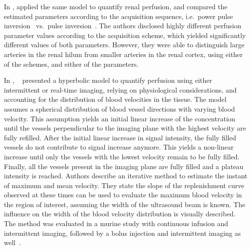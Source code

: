 In \citeyear{Schlosser:2001vv}, \citet{Schlosser:2001vv} applied the same model to quantify renal perfusion, %
and compared the estimated parameters according to the acquisition sequence, i.e.~power pulse inversion~\cite{Simpson:1997jn} vs.~pulse inversion~\cite{Burns:2000tl}. %
The authors disclosed highly different perfusion parameter values according to the acquisition scheme, which yielded significantly different values of both parameters.
However, they were able to distinguish large arteries in the renal hilum from smaller arteries in the renal cortex, using either of the schemes, and either of the parameters.

In \citeyear{Krix:2003tq}, ~\citet{Krix:2003tq} presented a hyperbolic model to quantify perfusion using either intermittent or real-time imaging, relying on physiological considerations, and accounting for the distribution of blood velocities in the tissue.  
The model assumes a spherical distribution of blood vessel directions with varying blood velocity.
This assumption yields an initial linear increase of the concentration until the vessels perpendicular to the imaging plane with the highest velocity are fully refilled. 
After the initial linear increase in signal intensity, the fully filled vessels do not contribute to signal increase anymore. This yields a non-linear increase until only the vessels with the lowest velocity remain to be fully filled. 
Finally, all the vessels present in the imaging plane are fully filled and a plateau intensity is reached. 
Authors describe an iterative method to estimate the instant of maximum and mean velocity.
They state the slope of the replenishment curve observed at these times can be used to evaluate the maximum blood velocity in the region of interest, assuming the width of the ultrasound beam is known.
The influence on the width of the blood velocity distribution is visually described.
The method was evaluated in a murine study with continuous infusion and intermittent imaging, followed by a bolus injection and intermittent imaging as well~\cite{Krix:2003wh}. %

